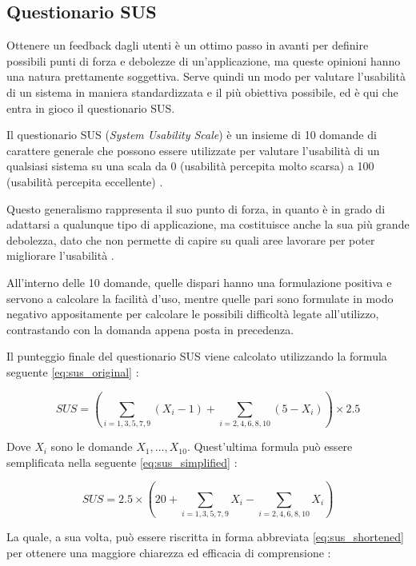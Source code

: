 \subsection{Questionario SUS}
Ottenere un feedback dagli utenti è un ottimo passo in avanti per definire possibili punti di forza e debolezze di un'applicazione, ma queste opinioni hanno una natura prettamente soggettiva. Serve quindi un modo per valutare l'usabilità di un sistema in maniera standardizzata e il più obiettiva possibile, ed è qui che entra in gioco il questionario SUS.

Il questionario SUS (\textit{System Usability Scale}) è un insieme di 10 domande di carattere generale che possono essere utilizzate per valutare l'usabilità di un qualsiasi sistema su una scala da 0 (usabilità percepita molto scarsa) a 100 (usabilità percepita eccellente) \cite{SUS}.

Questo generalismo rappresenta il suo punto di forza, in quanto è in grado di adattarsi a qualunque tipo di applicazione, ma costituisce anche la sua più grande debolezza, dato che non permette di capire su quali aree lavorare per poter migliorare l'usabilità \cite{SUS}.

All'interno delle 10 domande, quelle dispari hanno una formulazione positiva e servono a calcolare la facilità d'uso, mentre quelle pari sono formulate in modo negativo appositamente per calcolare le possibili difficoltà legate all'utilizzo, contrastando con la domanda appena posta in precedenza.

Il punteggio finale del questionario SUS viene calcolato utilizzando la formula seguente \eqref{eq:sus_original} \cite{SUS_DesignersItalia}:

\begin{equation}
    SUS = \left( \sum_{i=1,3,5,7,9} (X_i - 1) + \sum_{i=2,4,6,8,10} (5 - X_i) \right) \times 2.5
    \label{eq:sus_original}
\end{equation}

Dove \( X_i \) sono le domande \( X_1, ..., X_{10} \). Quest'ultima formula può essere semplificata nella seguente \eqref{eq:sus_simplified} \cite{SUS_Wikipedia}:

\begin{equation}
    SUS = 2.5 \times \left( 20 + \sum_{i=1,3,5,7,9} X_i - \sum_{i=2,4,6,8,10} X_i \right)
    \label{eq:sus_simplified}
\end{equation}

La quale, a sua volta, può essere riscritta in forma abbreviata \eqref{eq:sus_shortened} per ottenere una maggiore chiarezza ed efficacia di comprensione \cite{SUS_Wikipedia}:


